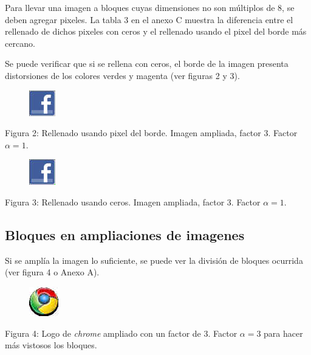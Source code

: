 \documentclass[%
final,
%
reprint,
%
notitlepage,
narroweqnarray,
inline,
twoside,
invited
]{ieee}
\begin{document}
Para llevar una imagen a bloques cuyas dimensiones no son múltiplos de 8, se deben agregar pixeles. La 
tabla 3 en el anexo C muestra la diferencia entre el rellenado de dichos pixeles con ceros y el rellenado usando 
el pixel del borde más cercano.


\par Se puede verificar que si se rellena con ceros, el borde de la imagen presenta distorsiones de los 
colores verdes y magenta (ver figuras 2 y 3).

\begin{figure}[H]
	\includegraphics[scale=3]{./img/facebookout.png}
\end{figure}
\begin{center}
\par Figura 2: Rellenado usando pixel del borde. Imagen ampliada, factor 3. Factor $\alpha=1$.
\end{center}

\begin{figure}[H]
	\includegraphics[scale=3]{./img/facebookout0.png}
\end{figure}
\begin{center}
\par Figura 3: Rellenado usando ceros. Imagen ampliada, factor 3. Factor $\alpha=1$.
\end{center}

\subsection{Bloques en ampliaciones de imagenes}

Si se amplía la imagen lo suficiente, se puede ver la división de bloques ocurrida (ver figura 4 o Anexo A).

\begin{figure}[H]
	\includegraphics[scale=3]{./img/chrome3out.png}
\end{figure}
\begin{center}
\par Figura 4: Logo de \textit{chrome} ampliado con un factor de 3. Factor $\alpha=3$ para hacer más vistosos los bloques.
\end{center}
\end{document}
